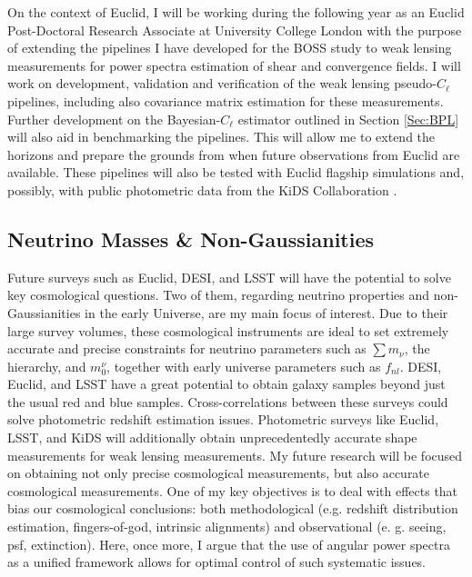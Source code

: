 \qquad On the context of Euclid, I will be working during the following year as an Euclid Post-Doctoral Research Associate at University College London with the purpose of extending the pipelines I have developed for the BOSS study to weak lensing measurements for power spectra estimation of shear and convergence fields. I will work on development, validation and verification of the weak lensing pseudo-$C_{\ell}$ pipelines, including also covariance matrix estimation for these measurements. Further development on the Bayesian-$C_{\ell}$ estimator outlined in Section \ref{Sec:BPL} will also aid in benchmarking the pipelines. This will allow me to extend the horizons and prepare the grounds from when future observations from Euclid are available. These pipelines will also be tested with Euclid flagship simulations and, possibly, with public photometric data from the KiDS Collaboration \citep{2017KiDS-DR3}.

\subsection{Neutrino Masses \& Non-Gaussianities}
Future surveys such as Euclid, DESI, and LSST will have the potential to solve key cosmological questions. Two of them, regarding neutrino properties and non-Gaussianities in the early Universe, are my main focus of interest. Due to their large survey volumes, these cosmological instruments are ideal to set extremely accurate and precise constraints for neutrino parameters such as $\sum m_{\nu}$, the hierarchy, and $m_{0}^{\nu}$, together with early universe parameters such as $f_{nl}$. DESI, Euclid, and LSST have a great potential to obtain galaxy samples beyond just the usual red and blue samples. Cross-correlations between these surveys could solve photometric redshift estimation issues. Photometric surveys like Euclid, LSST, and KiDS will additionally obtain unprecedentedly accurate shape measurements for weak lensing measurements. My future research will be focused on obtaining not only precise cosmological measurements, but also accurate cosmological measurements. One of my key objectives is to deal with effects that bias our cosmological conclusions: both methodological (e.g. redshift distribution estimation, fingers-of-god, intrinsic alignments) and observational (e. g. seeing, psf, extinction). Here, once more, I argue that the use of angular power spectra as a unified framework allows for optimal control of such systematic issues.

